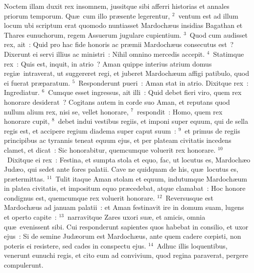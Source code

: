 \lettrine[lines=10,image=true,loversize=0.05,lraise=-0.03]{N}{}octem illam duxit rex insomnem, jussitque sibi afferri historias et annales priorum temporum. Qu\ae\ cum illo pr\ae sente legerentur,
${}^{2}$~ventum est ad illum locum ubi scriptum erat quomodo nuntiasset Mardoch\ae us insidias Bagathan et Thares eunuchorum, regem Assuerum jugulare cupientium.
${}^{3}$~Quod cum audisset rex, ait~: Quid pro hac fide honoris ac pr\ae mii Mardoch\ae us consecutus est~? Dixerunt ei servi illius ac ministri~: Nihil omnino mercedis accepit.
${}^{4}$~Statimque rex~: Quis est, inquit, in atrio~? Aman quippe interius atrium domus regi\ae\ intraverat, ut suggereret regi, et juberet Mardoch\ae um affigi patibulo, quod ei fuerat pr\ae paratum.
${}^{5}$~Responderunt pueri~: Aman stat in atrio. Dixitque rex~: Ingrediatur.
${}^{6}$~Cumque esset ingressus, ait illi~: Quid debet fieri viro, quem rex honorare desiderat~? Cogitans autem in corde suo Aman, et reputans quod nullum alium rex, nisi se, vellet honorare,
${}^{7}$~respondit~: Homo, quem rex honorare cupit,
${}^{8}$~debet indui vestibus regiis, et imponi super equum, qui de sella regis est, et accipere regium diadema super caput suum~:
${}^{9}$~et primus de regiis principibus ac tyrannis teneat equum ejus, et per plateam civitatis incedens clamet, et dicat~: Sic honorabitur, quemcumque voluerit rex honorare.
${}^{10}$~Dixitque ei rex~: Festina, et sumpta stola et equo, fac, ut locutus es, Mardoch\ae o Jud\ae o, qui sedet ante fores palatii. Cave ne quidquam de his, qu\ae\ locutus es, pr\ae termittas.
${}^{11}$~Tulit itaque Aman stolam et equum, indutumque Mardoch\ae um in platea civitatis, et impositum equo pr\ae cedebat, atque clamabat~: Hoc honore condignus est, quemcumque rex voluerit honorare.
${}^{12}$~Reversusque est Mardoch\ae us ad januam palatii~: et Aman festinavit ire in domum suam, lugens et operto capite~:
${}^{13}$~narravitque Zares uxori su\ae , et amicis, omnia qu\ae\ evenissent sibi. Cui responderunt sapientes quos habebat in consilio, et uxor ejus~: Si de semine Jud\ae orum est Mardoch\ae us, ante quem cadere cœpisti, non poteris ei resistere, sed cades in conspectu ejus.
${}^{14}$~Adhuc illis loquentibus, venerunt eunuchi regis, et cito eum ad convivium, quod regina paraverat, pergere compulerunt.

